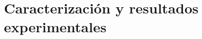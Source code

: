 \chapter{Caracterización y resultados experimentales}
\label{chap:results}
\textit{}
\vfill
\minitoc
\newpage